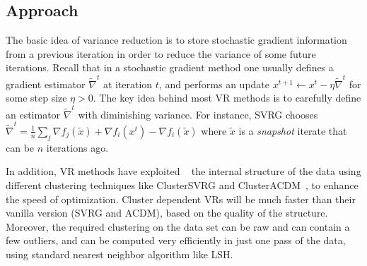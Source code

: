 \documentclass{article} %
\begin{document}

\subsection{Approach}

\newcommand{\tnabla}{\tilde{\nabla}}
\newcommand{\tx}{\tilde{x}}
\newcommand{\bx}{\bar{x}}
\newcommand{\lt}{\mathsf{lt}}
\newcommand{\li}{\mathsf{li}}
\newcommand{\cH}{H_{\mathsf{cl}}}

The basic idea of variance reduction is to store stochastic gradient information from a previous iteration in order to reduce the variance of some future iterations. Recall that in a stochastic gradient method one usually defines a gradient estimator $\tnabla^t$ at iteration $t$, and performs an update $x^{t+1} \gets x^t - \eta \tnabla^t$ for some step size $\eta>0$.
The key idea behind most VR methods is to carefully define an estimator $\tnabla^t$ with diminishing variance. For instance, SVRG chooses $\tnabla^t = \frac{1}{n} \sum_j \nabla f_j(\tx) + \nabla f_i(x^t) - \nabla f_i(\tx)$ where $\tx$ is a \emph{snapshot} iterate that can be $n$ iterations ago.

In addition, VR methods have exploited ~\cite{exploitingstructure,HLM2015} the internal structure of the data using different clustering techniques like ClusterSVRG and ClusterACDM~\cite{exploitingstructure}, to enhance the speed of optimization. Cluster dependent VRs will be much faster than their vanilla version (SVRG and ACDM), based on the quality of the structure.   
Moreover, the required clustering on the data set can be raw and can contain a few outliers, and can be computed very efficiently in just one pass of the data, using standard nearest neighbor algorithm like LSH. 
\end{document}
